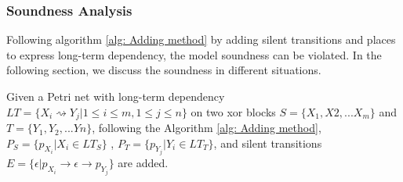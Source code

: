 \subsubsection{Soundness Analysis}
Following algorithm \ref{alg: Adding method} by adding silent transitions and places to express long-term dependency, the model soundness can be violated. In the following section, we discuss the soundness in different situations. 

Given a Petri net with long-term dependency $LT=\{X_i \rightsquigarrow Y_j \vert 1 \leq i \leq m, 1 \leq j \leq n \}$ on two xor blocks $S=\{X_1,X2,...X_m\}$ and $T=\{Y_1,Y_2,...Yn\}$, following the Algorithm \ref{alg: Adding method}, $P_S=\{p_{X_i} \vert X_i \in LT_{S} \}$ , $P_T=\{p_{Y_j} \vert Y_i \in LT_{T} \}$, and silent transitions $ E = \{\epsilon \vert p_{X_i} \rightarrow \epsilon
\rightarrow p_{Y_{j}} \}$ are added. 
 
